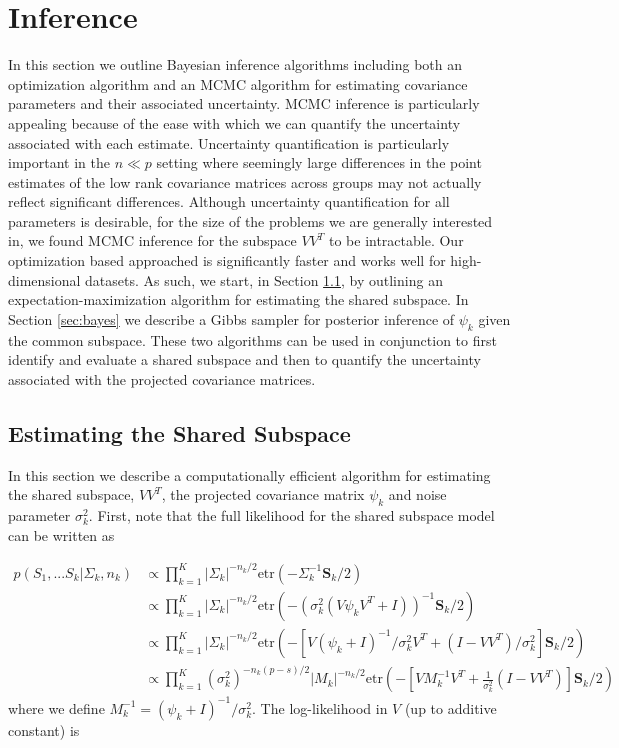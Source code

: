 \documentclass{article}
\newcommand{\etr}{\text{etr}}
\begin{document}
\section{Inference}
\label{sec:inference}
In this section we outline Bayesian inference algorithms including
both an optimization algorithm and an MCMC algorithm for estimating
covariance parameters and their associated uncertainty.  MCMC
inference is particularly appealing because of the ease with which we
can quantify the uncertainty associated with each estimate.
Uncertainty quantification is particularly important in the $n \ll p$
setting where seemingly large differences in the point estimates of
the low rank covariance matrices across groups may not actually
reflect significant differences.  Although uncertainty quantification
for all parameters is desirable, for the size of the problems we are
generally interested in, we found MCMC inference for the subspace
$VV^T$ to be intractable.  Our optimization based approached is
significantly faster and works well for high-dimensional datasets.  As
such, we start, in Section \ref{sec:em}, by outlining an
expectation-maximization algorithm for estimating the shared
subspace. In Section \ref{sec:bayes} we describe a Gibbs sampler for
posterior inference of $\psi_k$ given the common subspace.  These two
algorithms can be used in conjunction to first identify and evaluate a
shared subspace and then to quantify the uncertainty associated with
the projected covariance matrices.

\subsection{Estimating the Shared Subspace}
\label{sec:em}

In this section we describe a computationally efficient algorithm for
estimating the shared subspace, $VV^T$, the projected covariance matrix
$\psi_k$ and noise parameter $\sigma_k^2$.  First, note that the full
likelihood for the shared subspace model can be written as

\begin{align}
p(S_1, ... S_k | \Sigma_k,n_k) &\propto \prod_{k=1}^K |\Sigma_k|^{-n_k/2}\etr(-\Sigma_k^{-1}\mathbf{S}_k/2)  \\
&\propto \prod_{k=1}^K  |\Sigma_k|^{-n_k/2}\etr(-(\sigma_k^2(V\psi_kV^T +
  I))^{-1}\mathbf{S}_k/2) \\
&\propto \prod_{k=1}^K  |\Sigma_k|^{-n_k/2}\etr(-\left[V(\psi_k +
  I)^{-1}/\sigma_k^2 V^T + (I-VV^T)/\sigma^2_k\right]\mathbf{S}_k/2)
  \\
&\propto \prod_{k=1}^K  (\sigma_k^2)^{-n_k(p-s)/2}|M_k|^{-n_k/2}\etr(-\left[VM_k^{-1}V^T + \frac{1}{\sigma^2_k} (I-VV^T)\right]\mathbf{S}_k/2) 
\end{align}
%
\noindent where we define $M_k^{-1} = (\psi_k + I) ^{-1}/\sigma_k^2$.  The log-likelihood in
$V$ (up to additive constant) is
\end{document}
